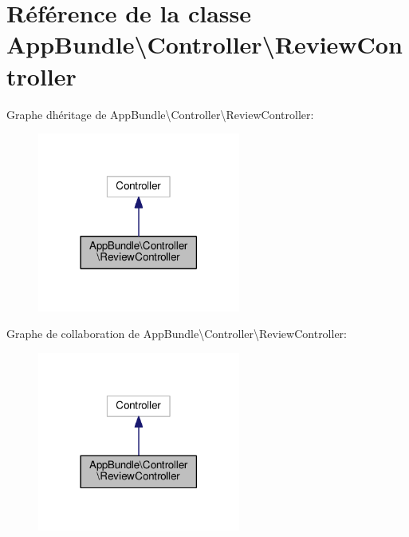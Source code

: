 \hypertarget{classAppBundle_1_1Controller_1_1ReviewController}{}\section{Référence de la classe App\+Bundle\textbackslash{}Controller\textbackslash{}Review\+Controller}
\label{classAppBundle_1_1Controller_1_1ReviewController}


Graphe d\textquotesingle{}héritage de App\+Bundle\textbackslash{}Controller\textbackslash{}Review\+Controller\+:\nopagebreak
\begin{figure}[H]
\begin{center}
\leavevmode
\includegraphics[width=189pt]{classAppBundle_1_1Controller_1_1ReviewController__inherit__graph}
\end{center}
\end{figure}


Graphe de collaboration de App\+Bundle\textbackslash{}Controller\textbackslash{}Review\+Controller\+:\nopagebreak
\begin{figure}[H]
\begin{center}
\leavevmode
\includegraphics[width=189pt]{classAppBundle_1_1Controller_1_1ReviewController__coll__graph}
\end{center}
\end{figure}
